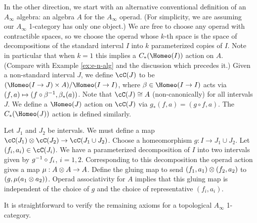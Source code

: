 In the other direction, we start with an alternative conventional definition of an $A_\infty$ algebra:
an algebra $A$ for the $A_\infty$ operad.
(For simplicity, we are assuming our $A_\infty$ 1-category has only one object.)
We are free to choose any operad with contractible spaces, so we choose the operad
whose $k$-th space is the space of decompositions of the standard interval $I$ into $k$
parameterized copies of $I$.
Note in particular that when $k=1$ this implies a $C_*(\Homeo(I))$ action on $A$.
(Compare with Example \ref{ex:e-n-alg} and the discussion which precedes it.)
Given a non-standard interval $J$, we define $\cC(J)$ to be
$(\Homeo(I\to J) \times A)/\Homeo(I\to I)$,
where $\beta \in \Homeo(I\to I)$ acts via $(f, a) \mapsto (f\circ \beta^{-1}, \beta_*(a))$.
Note that $\cC(J) \cong A$ (non-canonically) for all intervals $J$.
We define a $\Homeo(J)$ action on $\cC(J)$ via $g_*(f, a) = (g\circ f, a)$.
The $C_*(\Homeo(J))$ action is defined similarly.

Let $J_1$ and $J_2$ be intervals.
We must define a map $\cC(J_1)\ot\cC(J_2)\to\cC(J_1\cup J_2)$.
Choose a homeomorphism $g:I\to J_1\cup J_2$.
Let $(f_i, a_i)\in \cC(J_i)$.
We have a parameterized decomposition of $I$ into two intervals given by
$g^{-1} \circ f_i$, $i=1,2$.
Corresponding to this decomposition the operad action gives a map $\mu: A\otimes A\to A$.
Define the gluing map to send $(f_1, a_1)\otimes (f_2, a_2)$ to $(g, \mu(a_1\otimes a_2))$.
Operad associativity for $A$ implies that this gluing map is independent of the choice of
$g$ and the choice of representative $(f_i, a_i)$.

It is straightforward to verify the remaining axioms for a topological $A_\infty$ 1-category.








